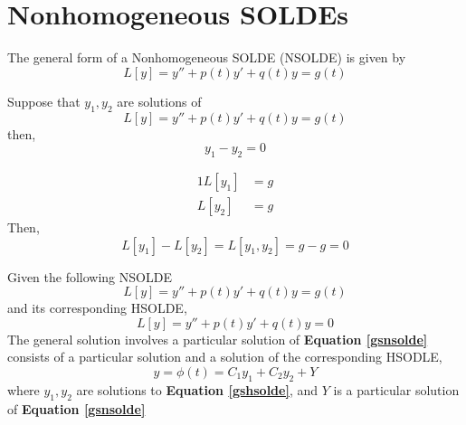 \documentclass[twoside]{report}
\begin{document}
    \section{Nonhomogeneous SOLDEs}
    \begin{definition}
        The general form of a Nonhomogeneous SOLDE (NSOLDE) is given by
        \begin{equation}
            L[y] = y'' + p(t)y' + q(t)y = g(t)
        \end{equation}
    \end{definition}
    \begin{btheorem}
        Suppose that $y_{1}, y_{2}$ are solutions of
        \begin{equation}
            L[y] = y'' + p(t)y' + q(t)y = g(t)
        \end{equation}
        then,
        \begin{equation}
            y_{1} - y_{2} = 0
        \end{equation}
    \end{btheorem}
    \begin{bproof}
        \begin{alignat}{1}
            L[y_{1}] & = g\\
            L[y_{2}] & = g
        \end{alignat}
        Then,
        \begin{equation}
            L[y_{1}] - L[y_{2}] = L[y_{1}, y_{2}] = g - g = 0
        \end{equation}
    \end{bproof}
    \begin{btheorem}
        Given the following NSOLDE
        \begin{equation}
            \label{gsnsolde}
            L[y] = y'' + p(t)y' + q(t)y = g(t)
        \end{equation}
        and its corresponding HSOLDE,
        \begin{equation}
            \label{gshsolde}
            L[y] = y'' + p(t)y' + q(t)y = 0
        \end{equation}
        The general solution involves a particular solution of \textbf{Equation \ref{gsnsolde}} consists of a particular solution and a solution of the corresponding HSODLE,
        \begin{equation}
            \label{gs}
            y = \phi(t) = C_{1}y_{1} + C_{2}y_{2} + Y
        \end{equation}
        where $y_{1}, y_{2}$ are solutions to \textbf{Equation \ref{gshsolde}}, and $Y$ is a particular solution of \textbf{Equation \ref{gsnsolde}}
    \end{btheorem}
\end{document}
